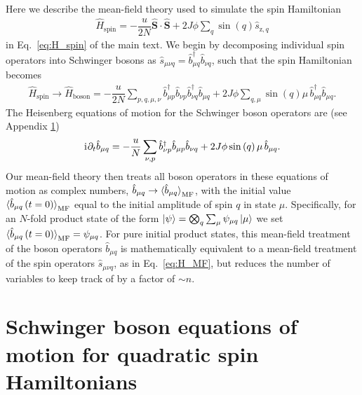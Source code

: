 \documentclass[aps,pra,nofootinbib,twocolumn,superscriptaddress]{revtex4-2}
\renewcommand{\t}{\text} %
\newcommand{\f}[2]{\dfrac{#1}{#2}} %
\newcommand{\p}[1]{\left(#1\right)} %
\newcommand{\bk}{\braket} %
\renewcommand{\v}{\bm} %
\renewcommand{\i}{\mathrm{i}\mkern1mu} %
\newcommand{\1}{\mathds{1}}
\renewcommand{\b}{\hat b}
\newcommand{\s}{\hat s}
\renewcommand{\H}{\hat H}
\renewcommand{\S}{\hat S}
\newcommand{\z}{\text{z}}
\newcommand{\spin}{\text{spin}}
\newcommand{\MF}{\text{MF}}
\begin{document}
Here we describe the mean-field theory used to simulate the spin Hamiltonian
\begin{align}
  \H_\spin = -\f{u}{2N}\v\S\cdot\v\S + 2J\phi \sum_q \sin\p{q} \s_{\z,q}
\end{align}
in Eq.~\eqref{eq:H_spin} of the main text.
We begin by decomposing individual spin operators into Schwinger bosons as $\s_{\mu\nu q} = \b_{\mu q}^\dag \b_{\nu q}$, such that the spin Hamiltonian becomes
\begin{align}
  \H_\spin \to \H_{\t{boson}}
  = -\f{u}{2N} \sum_{p,q,\mu,\nu}
  \b_{\mu p}^\dag \b_{\nu p} \b_{\nu q}^\dag \b_{\mu q}
  + 2J\phi \sum_{q,\mu} \sin\p{q} \mu\, \b_{\mu q}^\dag \b_{\mu q}.
\end{align}
The Heisenberg equations of motion for the Schwinger boson operators are (see Appendix \ref{sec:bosons})
\begin{align}
  \i \partial_t \b_{\mu q}
  = -\f{u}{N} \sum_{\nu,p} \b_{\nu p}^\dag \b_{\mu p} \b_{\nu q}
  + 2J\phi \sin\p{q} \mu\, \b_{\mu q}.
\end{align}
Our mean-field theory then treats all boson operators in these equations of motion as complex numbers, $\b_{\mu q}\to\bk{\b_{\mu q}}_\MF$, with the initial value $\bk{\b_{\mu q}\p{t=0}}_\MF$ equal to the initial amplitude of spin $q$ in state $\mu$.
Specifically, for an $N$-fold product state of the form $\ket\psi=\bigotimes_q\sum_\mu\psi_{\mu q}\ket{\mu}$ we set $\bk{\b_{\mu q}\p{t=0}}_\MF = \psi_{\mu q}$.
For pure initial product states, this mean-field treatment of the boson operators $\b_{\mu q}$ is mathematically equivalent to a mean-field treatment of the spin operators $\s_{\mu\nu q}$, as in Eq.~\eqref{eq:H_MF}, but reduces the number of variables to keep track of by a factor of $\sim n$.

\section{Schwinger boson equations of motion for quadratic spin Hamiltonians}
\label{sec:bosons}
\end{document}
